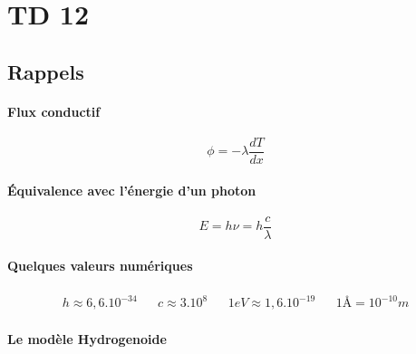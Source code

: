 \section{TD 12}



\subsection{Rappels}


\paragraph{Flux conductif}

$$\phi=-\lambda \frac{dT}{dx}$$


\paragraph{Équivalence avec l'énergie d'un photon} 

$$E=h\nu=h\frac{c}{\lambda}$$


\paragraph{Quelques valeurs numériques}

\begin{align*}
	h\approx 6,6.10^{-34} && c\approx 3.10^{8} && 1eV\approx 1,6.10^{-19} && 1\text{\AA} = 10^{-10}m
\end{align*}


\paragraph{Le modèle Hydrogenoide} 

